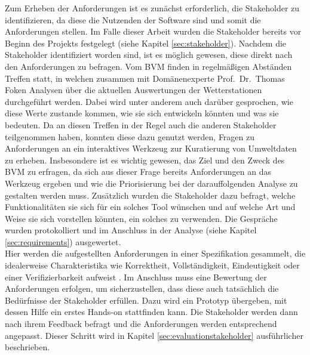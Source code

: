 Zum Erheben der Anforderungen ist es zunächst erforderlich, die Stakeholder zu identifizieren, da diese die Nutzenden der Software sind und somit die Anforderungen stellen. Im Falle dieser Arbeit wurden die Stakeholder bereits vor Beginn des Projekts festgelegt (siehe Kapitel \ref{sec:stakeholder}). Nachdem die Stakeholder identifiziert worden sind, ist es möglich gewesen, diese direkt nach den Anforderungen zu befragen. Vom \ac{BVM} finden in regelmäßigen Abständen Treffen statt, in welchen zusammen mit Domänenexperte Prof.\ Dr.\ Thomas Foken Analysen über die aktuellen Auswertungen der Wetterstationen durchgeführt werden. Dabei wird unter anderem auch darüber gesprochen, wie diese Werte zustande kommen, wie sie sich entwickeln könnten und was sie bedeuten. Da an diesen Treffen in der Regel auch die anderen Stakeholder teilgenommen haben, konnten diese dazu genutzt werden, Fragen zu Anforderungen an ein interaktives Werkzeug zur Kuratierung von Umweltdaten zu erheben. Insbesondere ist es wichtig gewesen, das Ziel und den Zweck des \ac{BVM} zu erfragen, da sich aus dieser Frage bereits Anforderungen an das Werkzeug ergeben und wie die Priorisierung bei der darauffolgenden Analyse zu gestalten werden muss. Zusätzlich wurden die Stakeholder dazu befragt, welche Funktionalitäten sie sich für ein solches Tool wünschen und auf welche Art und Weise sie sich vorstellen könnten, ein solches zu verwenden. Die Gespräche wurden protokolliert und im Anschluss in der Analyse (siehe Kapitel \ref{sec:requirements}) ausgewertet.\\ Hier werden die aufgestellten Anforderungen in einer Spezifikation gesammelt, die idealerweise Charakteristika wie Korrektheit, Vollständigkeit, Eindeutigkeit oder einer Verifizierbarkeit aufweist \cite{institute1984ieee}. Im Anschluss muss eine Bewertung der Anforderungen erfolgen, um sicherzustellen, dass diese auch tatsächlich die Bedürfnisse der Stakeholder erfüllen. Dazu wird ein Prototyp übergeben, mit dessen Hilfe ein erstes Hands-on stattfinden kann. Die Stakeholder werden dann nach ihrem Feedback befragt und die Anforderungen werden entsprechend angepasst. Dieser Schritt wird in Kapitel \ref{sec:evaluationstakeholder} ausführlicher beschrieben. 

